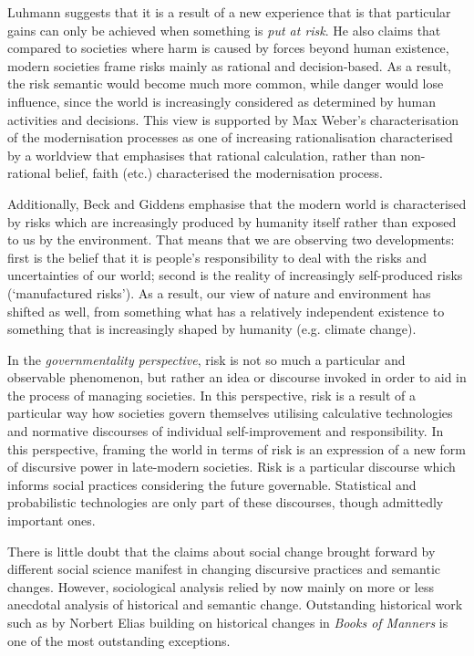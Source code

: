 Luhmann suggests that it is a result of a new experience that is that particular gains can only be achieved when something is \emph{put at risk}. He also claims that compared to societies where harm is caused by forces beyond human existence, modern societies frame risks mainly as rational and decision-based. As a result, the risk semantic would become much more common, while danger would lose influence,  since the world is increasingly considered as determined by human activities and decisions. This view is supported by Max Weber's characterisation of the modernisation processes as one of increasing rationalisation characterised by a worldview that emphasises that rational calculation, rather than non-rational belief, faith (etc.) characterised the modernisation process. 


Additionally, Beck and Giddens emphasise that the modern world is characterised by risks which are increasingly produced by humanity itself rather than exposed to us by the environment. That means that we are observing two developments: first is the belief that it is people's responsibility to deal with the risks and uncertainties of our world; second is the reality of increasingly self-produced risks (`manufactured risks'). As a result, our view of nature and environment has shifted as well, from something what has a relatively independent existence to something that is increasingly shaped by humanity (e.g. climate change).

In the \emph{governmentality perspective}, risk is not so much a particular and observable phenomenon, but rather an idea or discourse invoked in order to aid in the process of managing societies. In this perspective, risk is a result of a particular way how societies govern themselves utilising calculative technologies and normative discourses of individual self-improvement and responsibility. In this perspective, framing the world in terms of risk is an expression of a new form of discursive power in late-modern societies. Risk is a particular discourse which informs social practices considering the future governable. Statistical and probabilistic technologies are only part of these discourses, though admittedly important ones.

There is little doubt that the claims about social change brought forward by different social science manifest in changing discursive practices and semantic changes. However, sociological analysis relied by now mainly on more or less anecdotal analysis of historical and semantic change. Outstanding historical work such as by Norbert Elias building on historical changes in \emph{Books of Manners} is one of the most outstanding exceptions. 

